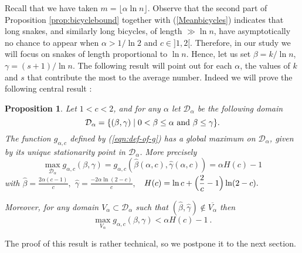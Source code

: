 \documentclass[aop,noinfoline]{imsart}
\newtheorem{proposition}[theorem]{Proposition}
\renewcommand{\hat}{\widehat}
\begin{document}
  Recall that we have taken $m= \lfloor \alpha\ln n\rfloor$. Observe
  that the second part of Proposition \ref{prop:bicyclebound} together with
  (\ref{Meanbicycles}) indicates that  long  snakes, and similarly
  long bicycles, of length $\gg \ln n$, have asymptotically no chance
  to appear when $\alpha>1/\ln 2$ and $c\in]1,2[$.  Therefore, in our study we will  focus  on snakes  of length proportional to $\ln n$.    Hence, let us
set $\beta=k/\ln n$, $\gamma=(s+1)/\ln n$. The following result will point out for each $\alpha$, the values of $k$ and $s$ that contribute the most to the average number. Indeed we  will prove the following central result :
\begin{proposition}\label{prop:function g}
 Let  $1<c<2$, and  for any $\alpha$ let $\mathcal{D}_{\alpha}$ be the following domain   
 $$\mathcal{D}_{\alpha} = \{ (\beta,
 \gamma) \mid  0< \beta \le \alpha  \hbox { and } \beta \le \gamma\}.$$
 The function $g_{\alpha,c}$ 
 defined by (\ref{eqn:def-of-g})  has a  global maximum on $\mathcal{D}_{\alpha}$, given by its unique stationarity point in $\mathcal{D}_{\alpha}$. More precisely 
\begin{equation}\label{Themax}
\max _{\mathcal{D}_{\alpha}}g_{\alpha,c}(\beta, \gamma)= g_{\alpha,c}(\hat\beta(\alpha,c), \hat\gamma(\alpha,c))= \alpha H(c)-1
\end{equation}
with
$\displaystyle \hat\beta= \frac{2\alpha(c-1)}{c},$
    $\displaystyle\hat\gamma=\frac{-2\alpha\ln (2-c)}{c},$ \ 
$\displaystyle H(c)=\ln c+ \Bigl( \frac{2}{c}-1\Bigr ) \ln(2-c).$

Moreover, for any domain $V_{\alpha} \subset   \mathcal{D}_{\alpha}$ such that $(\hat\beta, \hat\gamma) \notin \overline{V_{\alpha} }$ then 
\begin{equation}\label{Thepasmax}
\max _{V_{\alpha} }g_{\alpha,c}(\beta, \gamma)< \alpha H(c)-1\ .
\end{equation}

\end{proposition}
The proof of this result is rather technical, so we postpone it to the next section.\\
\end{document}
